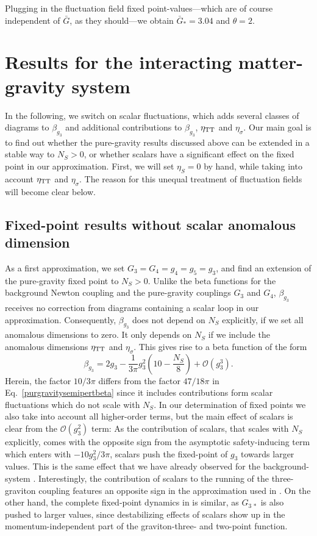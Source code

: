 \documentclass[11pt]{book} %
\newcommand{\be}{\begin{equation}}
\newcommand{\ee}{\end{equation}}
\numberwithin{equation}{chapter}
\begin{document}
Plugging in the fluctuation field fixed point-values---which are of course independent
of $\bar{G}$, as they should---we obtain $\bar{G}_{\ast} = 3.04$ and $\theta=2$.


\section{Results for the interacting matter-gravity system}
In the following, we switch on scalar fluctuations,
which adds several classes of diagrams to $\beta_{g_3}$ and additional contributions to
$\beta_{g_3}$, $\eta_{\rm TT}$ and $\eta_{\sigma}$.
Our main goal is to find out whether the pure-gravity results discussed above can be
extended in a stable way to $N_S>0$,
or whether scalars have a significant effect on the fixed point in our approximation.
First, we will set $\eta_S=0$ by hand, while taking into account $\eta_{\rm TT}$ and $\eta_{\sigma}$.
The reason for this unequal treatment of fluctuation fields will become clear below.

%
\subsection{Fixed-point results without scalar anomalous dimension}
%
As a first approximation, we set $G_3=G_4=g_4=g_5=g_3$,
and find an extension of the pure-gravity fixed point to $N_S>0$.
Unlike the beta functions for the background Newton coupling and the pure-gravity
couplings $G_3$ and $G_4$, $\beta_{g_3}$ receives no correction from diagrams containing
a scalar loop  in our approximation.
Consequently, $\beta_{g_3}$ does not depend on $N_S$ explicitly, if we set all anomalous dimensions to zero.
It only depends on $N_S$ if we include the anomalous dimensions $\eta_{\rm TT}$ and $\eta_{\sigma}$.
This gives rise to a beta function of the form
\be
\beta_{g_3}= 2g_3 -\frac{1}{3\pi}g_3^2\left(10-\frac{N_S}{8}\right)
+\mathcal{O}(g_3^3).
\label{norma}
\ee
Herein, the factor $10/3\pi$ differs from the  factor $47/18\pi$ in
Eq.~\eqref{purgravitysemipertbeta} since it includes contributions form scalar fluctuations
which do not scale with $N_S$.
In our determination of fixed points we also take into account all higher-order terms,
but the main effect of scalars is clear from the $\mathcal{O}(g_3^2)$ term:
As the contribution of scalars, that scales with $N_S$ explicitly,
comes with the opposite sign from the asymptotic safety-inducing term which enters with $-10g_3^2/3\pi$,
scalars push the fixed-point of $g_3$ towards larger values.
This is the same effect that we have already observed for the background-system \cite{Dona:2013qba}.
Interestingly, the contribution of scalars to the running of the three-graviton coupling features
an opposite sign in the approximation used in \cite{Meibohm:2015twa}.
On the other hand, the complete fixed-point dynamics in \cite{Meibohm:2015twa} is similar,
as $G_{3\,\ast}$ is also pushed to larger values,
since destabilizing effects of scalars show up in the momentum-independent part of the
graviton-three- and two-point function.
\end{document}
